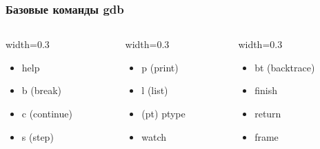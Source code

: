 \begin{frame}
  \frametitle{Базовые команды gdb}
  \begin{columns}
    \begin{column}{width=0.3\textwidth}
      \begin{itemize}
        \item help
        \item b (break)
        \item c (continue)
        \item s (step)
      \end{itemize}
    \end{column}
    
    \begin{column}{width=0.3\textwidth}
      \begin{itemize}
        \item p (print)
        \item l (list)
        \item (pt) ptype
        \item watch
      \end{itemize}
    \end{column}

    \begin{column}{width=0.3\textwidth}
      \begin{itemize}
        \item bt (backtrace)
        \item finish
        \item return
        \item frame
      \end{itemize}
    \end{column}
  \end{columns}
\end{frame}

